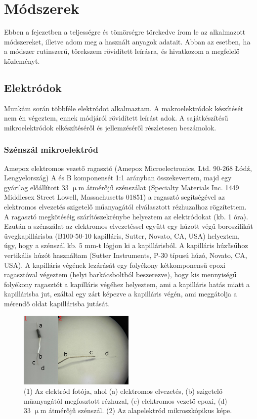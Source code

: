 \chapter{Módszerek}
\pagestyle{headings}

Ebben a fejezetben a teljességre és tömörségre törekedve írom le az alkalmazott módszereket, illetve adom meg a használt anyagok adatait. Abban az esetben, ha a módszer rutinszerű, törekszem rövidített leírásra, és hivatkozom a megfelelő közleményt.

\section{Elektródok}

Munkám során többféle elektródot alkalmaztam. A makroelektródok készítését nem én végeztem, ennek módjáról rövidített leírást adok. A sajátkészítésű mikroelektródok elkészítéséről és jellemzéséről részletesen beszámolok.

\subsection{Szénszál mikroelektród}
Amepox elektromos vezető ragasztó (Amepox Microelectronics, Ltd. 90-268 Łódź, Lengyelország) A és B komponensét 1:1 arányban összekevertem, majd egy gyárilag előállított 33 $\upmu$m átmérőjű szénszálat (Specialty Materials Inc. 1449 Middlesex Street Lowell, Massachusetts 01851) a ragasztó segítségével az elektromos elvezetés szigetelő műanyagától elválasztott rézhuzalhoz rögzítettem. A ragasztó megkötéséig szárítószekrénybe helyeztem az elektródokat (kb. 1 óra). Ezután a szénszálat az elektromos elvezetéssel együtt egy húzott végű boroszilikát üvegkapillárisba (B100-50-10 kapilláris, Sutter, Novato, CA, USA) helyeztem, úgy, hogy a szénszál kb. 5 mm-t lógjon ki a kapillárisból. A kapilláris húzűsűhoz vertikális húzót használtam (Sutter Instruments, P-30 típusú húzó, Novato, CA, USA). A kapilláris végének lezárását egy folyékony kétkomponensű epoxi ragasztóval végeztem (helyi barkácsboltból beszerezve), hogy kis mennyiségű folyékony ragasztót a kapilláris végéhez helyeztem, ami a kapilláris hatás miatt a kapillárisba jut, ezáltal egy zárt képezve a kapilláris végén, ami meggátolja a mérendő oldat kapillárisba jutását.
\begin{figure}[h]
\centering
\includegraphics[width=0.5\textwidth]{img/szen33.png}
\caption{(1) Az elektród fotója, ahol (a) elektromos elvezetés, (b) szigetelő műanyagától megfosztott rézhuzal, (c) elektromos vezető epoxi, (d) 33 $\upmu$m átmérőjű szénszál. (2) Az alapelektród mikroszkópikus képe.}
\label{fig:ionophores}
\end{figure}


